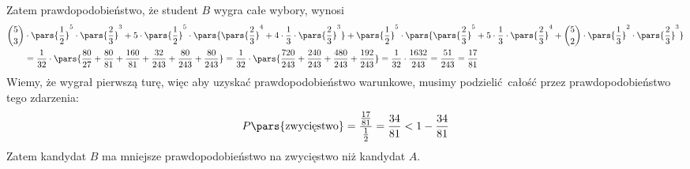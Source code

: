 Zatem prawdopodobieństwo, że student \(B\) wygra całe wybory, wynosi
\begin{equation*}
    \begin{split}
        \binom{5}{3} &\cdot \pars{\frac{1}{2}}^5 \cdot \pars{\frac{2}{3}}^3 + 5 \cdot \pars{\frac{1}{2}}^5 \cdot \pars{\pars{\frac{2}{3}}^4 + 4 \cdot \frac{1}{3} \cdot \pars{\frac{2}{3}}^3} + \pars{\frac{1}{2}}^5 \cdot \pars{\pars{\frac{2}{3}}^5 + 5 \cdot \frac{1}{3} \cdot \pars{\frac{2}{3}}^4 + \binom{5}{2} \cdot \pars{\frac{1}{3}}^2 \cdot \pars{\frac{2}{3}}^3}\\
                     &= \frac{1}{32} \cdot \pars{\frac{80}{27} + \frac{80}{81} + \frac{160}{81} + \frac{32}{243} + \frac{80}{243} + \frac{80}{243}}
                     = \frac{1}{32} \cdot \pars{\frac{720}{243} + \frac{240}{243} + \frac{480}{243} + \frac{192}{243}}
                     = \frac{1}{32} \cdot \frac{1632}{243}
                     = \frac{51}{243}
                     = \frac{17}{81}
    \end{split}
\end{equation*}
Wiemy, że wygrał pierwszą turę, więc aby uzyskać prawdopodobieństwo warunkowe, musimy podzielić całość przez prawdopodobieństwo tego zdarzenia:
\begin{equation*}
    P\pars{\text{zwycięstwo}}
    = \frac{\frac{17}{81}}{\frac{1}{2}}
    = \frac{34}{81}
    < 1 - \frac{34}{81}
\end{equation*}
Zatem kandydat \(B\) ma mniejsze prawdopodobieństwo na zwycięstwo niż kandydat \(A\).

